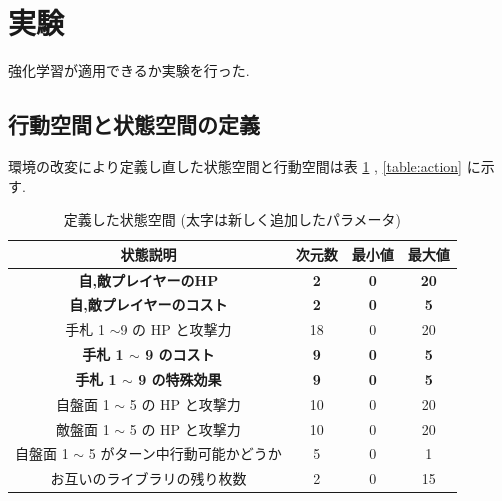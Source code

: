 \documentclass{jarticle}     %
\begin{document}
\section{実験}
強化学習が適用できるか実験を行った.
\subsection{行動空間と状態空間の定義}
環境の改変により定義し直した状態空間と行動空間は表 \ref{table:state} , \ref{table:action} に示す.
\begin{table}[H]
  \centering
  \caption{定義した状態空間 (太字は新しく追加したパラメータ)}
  \label{table:state}
  \begin{tabular}{|c|c|c|c|}
  \hline
  状態説明                        & 次元数        & 最小値        & 最大値         \\ \hline
  \textbf{自,敵プレイヤーのHP}  & \textbf{2} & \textbf{0} & \textbf{20} \\
  \hline
  \textbf{自,敵プレイヤーのコスト} & \textbf{2} & \textbf{0} & \textbf{5} \\ \hline

  手札 1 $\sim$9 の HP と攻撃力      & 18         & 0          & 20          \\ \hline
  \textbf{手札 1 $\sim$ 9 のコスト} & \textbf{9} & \textbf{0} & \textbf{5} \\ \hline
  \textbf{手札 1 $\sim$ 9 の特殊効果} &  \textbf{9} & \textbf{0} & \textbf{5} \\ \hline
  自盤面 1 $\sim$ 5 の HP と攻撃力     & 10         & 0          & 20          \\ \hline
  敵盤面 1 $\sim$ 5 の HP と攻撃力     & 10         & 0          & 20          \\ \hline
  自盤面 1 $\sim$ 5 がターン中行動可能かどうか & 5          & 0          & 1           \\ \hline
  お互いのライブラリの残り枚数     & 2 & 0 & 15 \\ \hline
  \end{tabular}
  \end{table}
\end{document}
